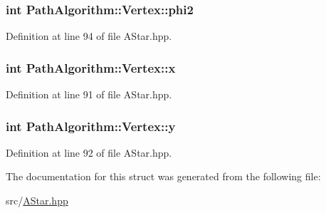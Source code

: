 \subsubsection[{\texorpdfstring{phi2}{phi2}}]{\setlength{\rightskip}{0pt plus 5cm}int Path\+Algorithm\+::\+Vertex\+::phi2}\hypertarget{struct_path_algorithm_1_1_vertex_af6701fe63c91cea4bc7e25efb276df7c}{}\label{struct_path_algorithm_1_1_vertex_af6701fe63c91cea4bc7e25efb276df7c}


Definition at line 94 of file A\+Star.\+hpp.

\subsubsection[{\texorpdfstring{x}{x}}]{\setlength{\rightskip}{0pt plus 5cm}int Path\+Algorithm\+::\+Vertex\+::x}\hypertarget{struct_path_algorithm_1_1_vertex_afe7ba337aa9af618c18c7ab19da65ea9}{}\label{struct_path_algorithm_1_1_vertex_afe7ba337aa9af618c18c7ab19da65ea9}


Definition at line 91 of file A\+Star.\+hpp.

\subsubsection[{\texorpdfstring{y}{y}}]{\setlength{\rightskip}{0pt plus 5cm}int Path\+Algorithm\+::\+Vertex\+::y}\hypertarget{struct_path_algorithm_1_1_vertex_ae6428b0c59bbbcd5aad9cf244a38bef2}{}\label{struct_path_algorithm_1_1_vertex_ae6428b0c59bbbcd5aad9cf244a38bef2}


Definition at line 92 of file A\+Star.\+hpp.



The documentation for this struct was generated from the following file\+:\begin{DoxyCompactItemize}
\item 
src/\hyperlink{_a_star_8hpp}{A\+Star.\+hpp}\end{DoxyCompactItemize}
